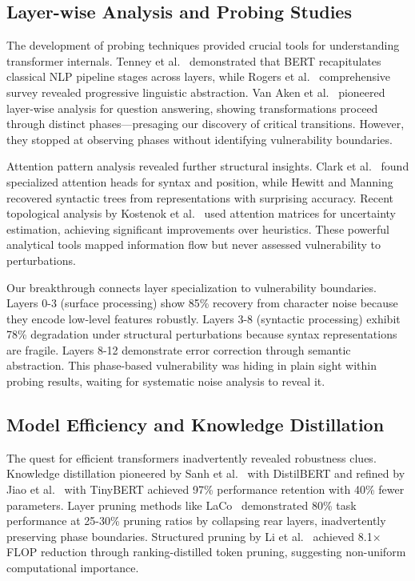 \subsection{Layer-wise Analysis and Probing Studies}

The development of probing techniques provided crucial tools for understanding transformer internals. Tenney et al.~\cite{tenney2019bert} demonstrated that BERT recapitulates classical NLP pipeline stages across layers, while Rogers et al.~\cite{rogers2020primer} comprehensive survey revealed progressive linguistic abstraction. Van Aken et al.~\cite{vanaken2019howdoes} pioneered layer-wise analysis for question answering, showing transformations proceed through distinct phases—presaging our discovery of critical transitions. However, they stopped at observing phases without identifying vulnerability boundaries.

Attention pattern analysis revealed further structural insights. Clark et al.~\cite{clark2019what} found specialized attention heads for syntax and position, while Hewitt and Manning~\cite{hewitt2019structural} recovered syntactic trees from representations with surprising accuracy. Recent topological analysis by Kostenok et al.~\cite{kostenok2023uncertainty} used attention matrices for uncertainty estimation, achieving significant improvements over heuristics. These powerful analytical tools mapped information flow but never assessed vulnerability to perturbations.

Our breakthrough connects layer specialization to vulnerability boundaries. Layers 0-3 (surface processing) show 85\% recovery from character noise because they encode low-level features robustly. Layers 3-8 (syntactic processing) exhibit 78\% degradation under structural perturbations because syntax representations are fragile. Layers 8-12 demonstrate error correction through semantic abstraction. This phase-based vulnerability was hiding in plain sight within probing results, waiting for systematic noise analysis to reveal it.

\subsection{Model Efficiency and Knowledge Distillation}

The quest for efficient transformers inadvertently revealed robustness clues. Knowledge distillation pioneered by Sanh et al.~\cite{sanh2019distilbert} with DistilBERT and refined by Jiao et al.~\cite{jiao2020tinybert} with TinyBERT achieved 97\% performance retention with 40\% fewer parameters. Layer pruning methods like LaCo~\cite{yang2024laco} demonstrated 80\% task performance at 25-30\% pruning ratios by collapsing rear layers, inadvertently preserving phase boundaries. Structured pruning by Li et al.~\cite{li2023constraint} achieved 8.1× FLOP reduction through ranking-distilled token pruning, suggesting non-uniform computational importance.

